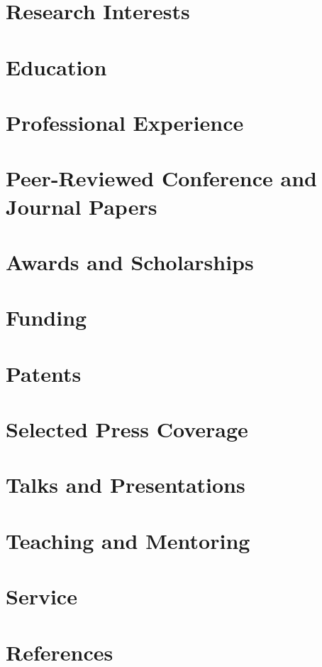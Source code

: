 \documentclass{chencv}
\affiliation{University of California, Los Angeles}
\begin{document}
\makecvtitle

\section{Research Interests}


\section{Education}


\section{Professional Experience}


\section{Peer-Reviewed Conference and Journal Papers}


\section{Awards and Scholarships}


\section{Funding}


\section{Patents}


\section{Selected Press Coverage}


\section{Talks and Presentations}


\section{Teaching and Mentoring}


\section{Service}


\section{References}

\end{document}
